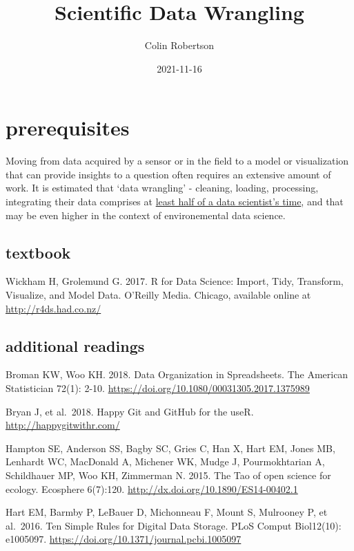 \documentclass[
]{book}
\title{Scientific Data Wrangling}
\author{Colin Robertson}
\date{2021-11-16}
\begin{document}
\maketitle

{
\setcounter{tocdepth}{1}
\tableofcontents
}
\hypertarget{prerequisites}{%
\chapter{prerequisites}\label{prerequisites}}

Moving from data acquired by a sensor or in the field to a model or visualization that can provide insights to a question often requires an extensive amount of work. It is estimated that `data wrangling' - cleaning, loading, processing, integrating their data comprises at \href{https://www.datanami.com/2020/07/06/data-prep-still-dominates-data-scientists-time-survey-finds/}{least half of a data scientist's time}, and that may be even higher in the context of environemental data science.

\hypertarget{textbook}{%
\section{textbook}\label{textbook}}

Wickham H, Grolemund G. 2017. R for Data Science: Import, Tidy, Transform, Visualize, and Model Data. O'Reilly Media. Chicago, available online at \url{http://r4ds.had.co.nz/}

\hypertarget{additional-readings}{%
\section{additional readings}\label{additional-readings}}

Broman KW, Woo KH. 2018. Data Organization in Spreadsheets. The American Statistician 72(1): 2-10. \url{https://doi.org/10.1080/00031305.2017.1375989}

Bryan J, et al.~2018. Happy Git and GitHub for the useR. \url{http://happygitwithr.com/}

Hampton SE, Anderson SS, Bagby SC, Gries C, Han X, Hart EM, Jones MB, Lenhardt WC, MacDonald A, Michener WK, Mudge J, Pourmokhtarian A, Schildhauer MP, Woo KH, Zimmerman N. 2015. The Tao of open science for ecology. Ecosphere 6(7):120. \url{http://dx.doi.org/10.1890/ES14-00402.1}

Hart EM, Barmby P, LeBauer D, Michonneau F, Mount S, Mulrooney P, et al.~2016. Ten Simple Rules for Digital Data Storage. PLoS Comput Biol12(10): e1005097. \url{https://doi.org/10.1371/journal.pcbi.1005097}
\end{document}
